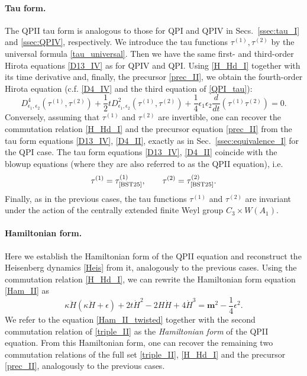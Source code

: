 \documentclass[12pt,a4paper]{article}
\numberwithin{equation}{section}
\begin{document}
\paragraph{Tau form.}
The QPII tau form is analogous to those for QPI and QPIV in Secs.~\ref{ssec:tau_I} and \eqref{ssec:QPIV}, respectively. We introduce the tau functions $\tau^{(1)},\tau^{(2)}$ by the universal formula \eqref{tau_universal}. Then we have the same first- and third-order Hirota equations \eqref{D13_IV} as for QPIV and QPI. Using \eqref{H_Hd_I} together with its time derivative and, finally, the precursor \eqref{prec_II}, we obtain the fourth-order Hirota equation (c.f. \eqref{D4_IV} and the third equation of \eqref{QPI_tau}):
\begin{equation}\label{D4_II}
D^4_{\epsilon_1,\epsilon_2}\left(\tau^{(1)},\tau^{(2)}\right)+\frac12t D^2_{\epsilon_1,\epsilon_2}\left(\tau^{(1)},\tau^{(2)}\right)+\frac14\epsilon_1\epsilon_2\frac{d}{dt}\left(\tau^{(1)}\tau^{(2)}\right)=0.    
\end{equation}
Conversely, assuming that $\tau^{(1)}$ and $\tau^{(2)}$ are invertible, one can recover the commutation relation \eqref{H_Hd_I} and the precursor equation \eqref{prec_II} from the tau form equations \eqref{D13_IV}, \eqref{D4_II}, exactly as in Sec.~\ref{ssec:equivalence_I} for the QPI case. 
The tau form equations \eqref{D13_IV}, \eqref{D4_II} coincide with the blowup equations \cite[(3.10),(3.15)]{BST25} (where they are also referred to as the QPII equation), i.e.
\begin{equation}\label{conn_II}
\tau^{(1)}=\tau^{(1)}_{\textrm{\cite{BST25}}}, \qquad \tau^{(2)}=\tau^{(2)}_{\textrm{\cite{BST25}}}.    
\end{equation}
Finally, as in the previous cases, the tau functions $\tau^{(1)}$ and $\tau^{(2)}$ are invariant under the action of the centrally extended finite Weyl group $C_3\times W(A_1)$.

\paragraph{Hamiltonian form.}
Here we establish the Hamiltonian form of the QPII equation and reconstruct the Heisenberg dynamics \eqref{Heis} from it, analogously to the previous cases. Using the commutation relation \eqref{H_Hd_I}, we can rewrite the Hamiltonian form equation \eqref{Ham_II} as
\begin{equation}\label{Ham_II_twisted}
\kappa\ddot{H}(\kappa\ddot{H}+\epsilon)+2t\dot{H}^2-2H\dot{H}+4\dot{H}^3=\boldsymbol{m}^2-\frac14\epsilon^2.
\end{equation}
We refer to the equation \eqref{Ham_II_twisted} together with the second commutation relation of \eqref{triple_II} as the \textit{Hamiltonian form} of the QPII equation.
From this Hamiltonian form, one can recover the remaining two commutation relations of the full set \eqref{triple_II}, \eqref{H_Hd_I} and the precursor \eqref{prec_II}, analogously to the previous cases.
\end{document}
